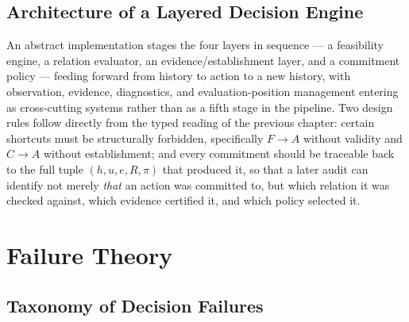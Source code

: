 \documentclass[11pt]{report}
\theoremstyle{definition}
\theoremstyle{plain}
\begin{document}
\chapter{Architecture of a Layered Decision Engine}

An abstract implementation stages the four layers in sequence --- a feasibility engine, a relation evaluator, an evidence/establishment layer, and a commitment policy --- feeding forward from history to action to a new history, with observation, evidence, diagnostics, and evaluation-position management entering as cross-cutting systems rather than as a fifth stage in the pipeline. Two design rules follow directly from the typed reading of the previous chapter: certain shortcuts must be structurally forbidden, specifically $F \to A$ without validity and $C \to A$ without establishment; and every commitment should be traceable back to the full tuple $(h,u,e,R,\pi)$ that produced it, so that a later audit can identify not merely \emph{that} an action was committed to, but which relation it was checked against, which evidence certified it, and which policy selected it.

\part{Failure Theory}

\chapter{Taxonomy of Decision Failures}
\end{document}
